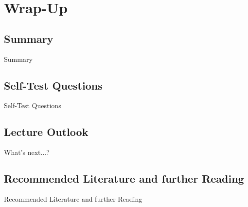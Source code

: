 \section{Wrap-Up}

\subsection{Summary}

\begin{frame}{Summary}{}

\end{frame}


\subsection{Self-Test Questions}

\begin{frame}{Self-Test Questions}{}\important

\end{frame}


\subsection{Lecture Outlook}

\begin{frame}{What's next...?}{}
\end{frame}


\subsection{Recommended Literature and further Reading}

\begin{frame}{Recommended Literature and further Reading}{}
	\footnotesize
	\begin{thebibliography}{2}

	\end{thebibliography}
\end{frame}


\makethanks

